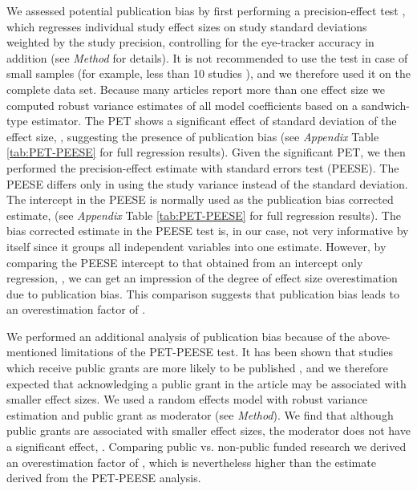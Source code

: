 We assessed potential publication bias by first performing a precision-effect test \citep[PET][]{stanley2014}, which regresses individual study effect sizes on study standard deviations weighted by the study precision, controlling for the eye-tracker accuracy in addition (see \textit{Method} for details). It is not recommended to use the test in case of small samples (for example, less than 10 studies \citep{vanaert2019}), and we therefore used it on the complete data set. Because many articles report more than one effect size we computed robust variance estimates of all model coefficients based on a sandwich-type estimator. The PET shows a significant effect of standard deviation of the effect size, \unskip, suggesting the presence of publication bias (see \textit{Appendix} Table \ref{tab:PET-PEESE} for full regression results). Given the significant PET, we then performed the precision-effect estimate with standard errors test (PEESE). The PEESE differs only in using the study variance instead of the standard deviation. The intercept in the PEESE is normally used as the publication bias corrected estimate,  (see \textit{Appendix} Table \ref{tab:PET-PEESE} for full regression results). The bias corrected estimate in the PEESE test is, in our case, not very informative by itself since it groups all independent variables into one estimate. However, by comparing the PEESE intercept to that obtained from an intercept only regression, \unskip, we can get an impression of the degree of effect size overestimation due to publication bias. This comparison suggests that publication bias leads to an overestimation factor of \unskip.

We performed an additional analysis of publication bias because of the above-mentioned limitations of the PET-PEESE test. It has been shown that studies which receive public grants are more likely to be published \citep{canestaro2017}, and we therefore expected that acknowledging a public grant in the article may be associated with smaller effect sizes. We used a random effects model with robust variance estimation and public grant as moderator (see \textit{Method}). We find that although public grants are associated with smaller effect sizes, the moderator does not have a significant effect, \unskip. Comparing public vs. non-public funded research we derived an overestimation factor of \unskip, which is nevertheless higher than the estimate derived from the PET-PEESE analysis.

